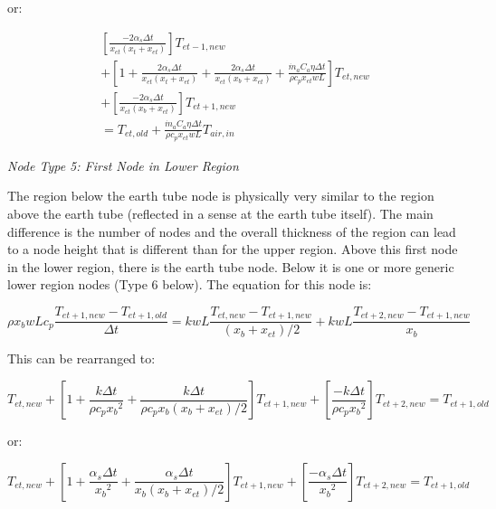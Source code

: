 or:

\begin{equation}
\begin{split}
[ \frac{-2 \alpha_s \Delta t}{x_{et} (x_t + x_{et})} ] T_{et-1,new} \\
 + [ 1 + \frac{2 \alpha_s \Delta t}{x_{et} (x_t + x_{et})} + \frac{2 \alpha_s \Delta t}{x_{et} (x_b+x_{et})} + \frac{\dot m_a {C_a} \eta \Delta t}{\rho c_p x_{et} w L} ] T_{et,new} \\
 + [ \frac{-2 \alpha_s \Delta t}{x_{et} (x_b + x_{et})} ] T_{et+1,new} \\
 = T_{et,old} + \frac{\dot m_a {C_a} \eta \Delta t}{\rho c_p x_{et} w L} T_{air,in}
\end{split}
\end{equation}

\emph{\textit{Node Type 5: First Node in Lower Region}}

The region below the earth tube node is physically very similar to the region above the earth tube (reflected in a sense at the earth tube itself).  The main difference is the number of nodes and the overall thickness of the region can lead to a node height that is different than for the upper region.  Above this first node in the lower region, there is the earth tube node.  Below it is one or more generic lower region nodes (Type 6 below).  The equation for this node is:

\begin{equation}
\rho x_b w L c_p \frac{T_{et+1,new} - T_{et+1,old}}{\Delta t} = k w L \frac{T_{et,new}-T_{et+1,new}}{(x_b + x_{et})/2} + k w L \frac{T_{et+2,new}-T_{et+1,new}}{x_b}
\end{equation}

This can be rearranged to:

\begin{equation}
[\frac{-k \Delta t}{\rho c_p x_b (x_b + x_{et})/2}] T_{et,new} + [1 + \frac{k \Delta t}{\rho c_p {x_b}^2} + \frac{k \Delta t}{\rho c_p x_b (x_b+x_{et})/2}] T_{et+1,new} + [\frac{-k \Delta t}{\rho c_p {x_b}^2}] T_{et+2,new} = T_{et+1,old}
\end{equation}

or:

\begin{equation}
[\frac{-\alpha_s \Delta t}{x_b (x_b + x_{et})/2}] T_{et,new} + [1 + \frac{\alpha_s \Delta t}{{x_b}^2} + \frac{\alpha_s \Delta t}{x_b (x_b+x_{et})/2}] T_{et+1,new} + [\frac{-\alpha_s \Delta t}{{x_b}^2}] T_{et+2,new} = T_{et+1,old}
\end{equation}

